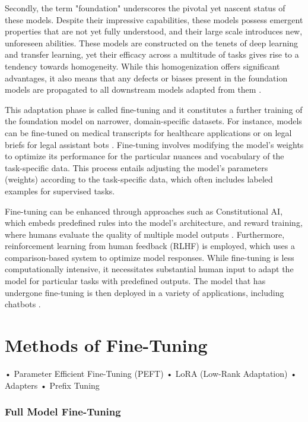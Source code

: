 Secondly, the term "foundation" underscores the pivotal yet nascent status of these models. Despite their impressive capabilities, these models possess emergent properties that are not yet fully understood, and their large scale introduces new, unforeseen abilities. These models are constructed on the tenets of deep learning and transfer learning, yet their efficacy across a multitude of tasks gives rise to a tendency towards homogeneity. While this homogenization offers significant advantages, it also means that any defects or biases present in the foundation models are propagated to all downstream models adapted from them \cite{bommasani2021opportunities}.

This adaptation phase is called fine-tuning and it constitutes a further training of the foundation model on narrower, domain-specific datasets. For instance, models can be fine-tuned on medical transcripts for healthcare applications or on legal briefs for legal assistant bots \cite{radford2019language}. Fine-tuning involves modifying the model’s weights to optimize its performance for the particular nuances and vocabulary of the task-specific data. This process entails adjusting the model's parameters (weights) according to the task-specific data, which often includes labeled examples for supervised tasks.

Fine-tuning can be enhanced through approaches such as Constitutional AI, which embeds predefined rules into the model's architecture, and reward training, where humans evaluate the quality of multiple model outputs \cite{bai2022constitutional}. Furthermore, reinforcement learning from human feedback (RLHF) is employed, which uses a comparison-based system to optimize model responses. While fine-tuning is less computationally intensive, it necessitates substantial human input to adapt the model for particular tasks with predefined outputs. The model that has undergone fine-tuning is then deployed in a variety of applications, including chatbots \cite{ouyang2022training}.

\section{Methods of Fine-Tuning}

	•	Parameter Efficient Fine-Tuning (PEFT)
	•	LoRA (Low-Rank Adaptation)
	•	Adapters
	•	Prefix Tuning

\subsubsection{Full Model Fine-Tuning}

